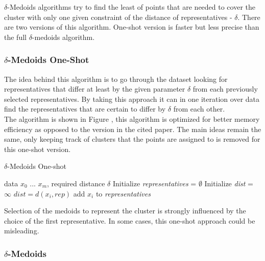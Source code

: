 \documentclass[thesis=B,english]{FITthesis}[2012/10/20]
\begin{document}
$\delta$-Medoids algorithms try to find the least of points that are needed to cover the cluster with only one given constraint of the distance of representatives - $\delta$.
There are two versions of this algorithm.
One-shot version is faster but less precise than the full $\delta$-medoids algorithm.

\subsubsection{$\delta$-Medoids One-Shot}

The idea behind this algorithm is to go through the dataset looking for representatives that differ at least by the given parameter $\delta$ from each previously selected representatives.
By taking this approach it can in one iteration over data find the representatives that are certain to differ by $\delta$ from each other. \\

The algorithm is shown in Figure , this algorithm is optimized for better memory efficiency as opposed to the version in the cited paper.
The main ideas remain the same, only keeping track of clusters that the points are assigned to is removed for this one-shot version.

\begin{algorithm}
    \caption{$\delta$-Medoids One-shot}
    \label{delta_medoids_one_shot}
    \begin{algorithmic}[1]
        \INPUT data $x_0$ ... $x_m$, required distance $\delta$
        \STATE Initialize \textit{representatives} = $\emptyset$
            \STATE Initialize \textit{dist} = $\infty$
                    \STATE $dist = d(x_i, rep)$
                \ENDIF
            \ENDFOR
                \STATE add $x_i$ to \textit{representatives}
            \ENDIF
        \ENDFOR
    \end{algorithmic}
\end{algorithm}


Selection of the medoids to represent the cluster is strongly influenced by the choice of the first representative.
In some cases, this one-shot approach could be misleading.

\subsubsection{$\delta$-Medoids}
\end{document}
